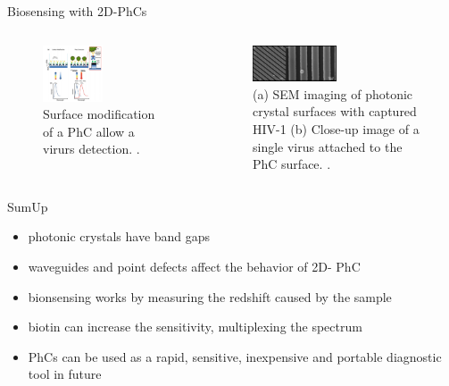 \begin{frame}{Biosensing with 2D-PhCs}
\begin{columns}
  \begin{column}{0.48\textwidth}
    \begin{figure}
      \centering
      \includegraphics[width=0.5\textwidth]{./bilder/reflektion.png}
      \caption{Surface modification of a PhC allow a virurs detection. \cite{nano}.}
      \label{fig: virus detection}
    \end{figure}
  \end{column}

  \begin{column}{0.48\textwidth}
    \begin{figure}
      \centering
      \includegraphics[width=0.5\textwidth]{./bilder/virus_surface.png}
      \caption{(a) SEM imaging of photonic crystal surfaces with captured HIV-1 (b) Close-up image of a single virus attached to the PhC surface. \cite{virus_surface}.}
      \label{fig: virus_on_surface}
    \end{figure}
  \end{column}
\end{columns}

\end{frame}

\begin{frame}{SumUp}
  \begin{itemize}
    \setlength\itemsep{1.2em}
    \item{photonic crystals have band gaps}
    \item{waveguides and point defects affect the behavior of 2D- PhC}
    \item{bionsensing works by measuring the redshift caused by the sample}
    \item{biotin can increase the sensitivity, multiplexing the spectrum}
    \item{PhCs can be used as a rapid, sensitive, inexpensive and portable diagnostic tool in future}
  \end{itemize}
\end{frame}

\begin{frame}[allowframebreaks]
  \nocite{*}
  \printbibliography
\end{frame}

